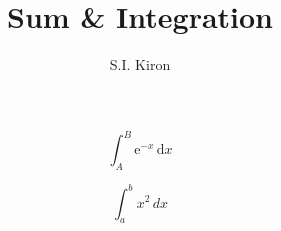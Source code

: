 \documentclass[11 pt, letterpaper]{article}
\title{Sum \& Integration}
\author{S.I. Kiron}
\begin{document}
\maketitle

$$ \int_{A}^{B} \mathrm{e}^{-x}\,\mathrm{d}x $$

\[ \int_{a}^{b} x^2 \,dx \]
\end{document}
